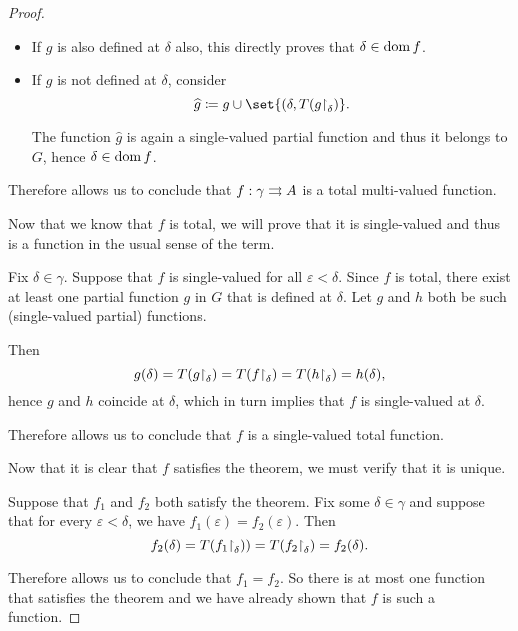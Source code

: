 \begin{proof}
  \begin{itemize}
    \item If \( g \) is also defined at \( \delta \) also, this directly proves that \( \delta \in \operatorname{dom} f \).
    \item If \( g \) is not defined at \( \delta \), consider
    \begin{equation*}
      \widehat g \coloneqq g \cup \set{ (\delta, T(g\restr_\delta) }.
    \end{equation*}

    The function \( \widehat g \) is again a single-valued partial function and thus it belongs to \( G \), hence \( \delta \in \operatorname{dom} f \).
  \end{itemize}

  Therefore  allows us to conclude that \( f: \gamma \rightrightarrows A \) is a total multi-valued function.

   Now that we know that \( f \) is total, we will prove that it is single-valued and thus is a function in the usual sense of the term.

  Fix \( \delta \in \gamma \). Suppose that \( f \) is single-valued for all \( \varepsilon < \delta \). Since \( f \) is total, there exist at least one partial function \( g \) in \( G \) that is defined at \( \delta \). Let \( g \) and \( h \) both be such (single-valued partial) functions.

  Then
  \begin{equation*}
    g(\delta) = T(g{\upharpoonright}_\delta) = T(f{\upharpoonright}_\delta) = T(h{\upharpoonright}_\delta) = h(\delta),
  \end{equation*}
  hence \( g \) and \( h \) coincide at \( \delta \), which in turn implies that \( f \) is single-valued at \( \delta \).

  Therefore  allows us to conclude that \( f \) is a single-valued total function.

   Now that it is clear that \( f \) satisfies the theorem, we must verify that it is unique.

  Suppose that \( f_1 \) and \( f_2 \) both satisfy the theorem. Fix some \( \delta \in \gamma \) and suppose that for every \( \varepsilon < \delta \), we have \( f_1(\varepsilon) = f_2(\varepsilon) \). Then
  \begin{equation*}
    f_2(\delta) = T(f_1{\upharpoonright}_\delta)) = T(f_2{\upharpoonright}_\delta) = f_2(\delta).
  \end{equation*}

  Therefore  allows us to conclude that \( f_1 = f_2 \). So there is at most one function that satisfies the theorem and we have already shown that \( f \) is such a function.
\end{proof}

